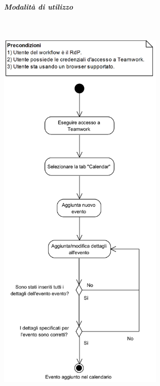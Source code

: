 \subparagraph{Modalità di utilizzo} \label{sec:procedure_teamwork}\mbox{}
\begin{samepage}
	\mbox{}\\
	\begin{center}
		\includegraphics[width=8cm]{../../documenti/NormeDiProgetto/DiagrammiProcedure/CreazioneEventoNelCalendario.png}
	\end{center}
\end{samepage}

